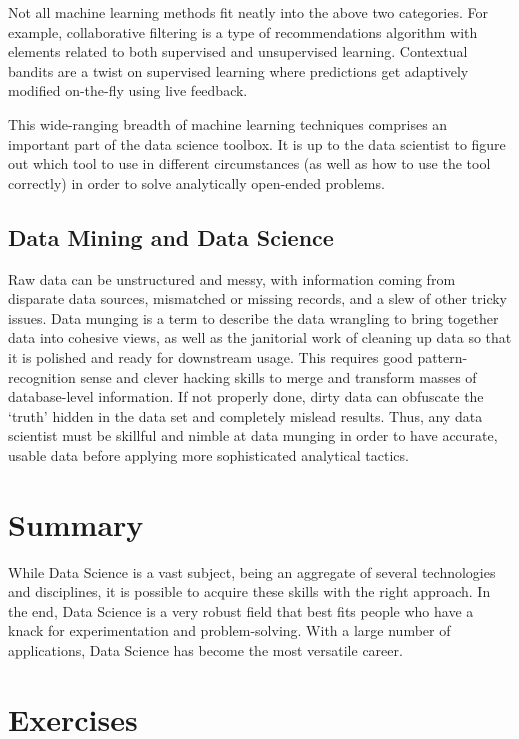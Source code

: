 \documentclass[
]{book}
\begin{document}
Not all machine learning methods fit neatly into the above two categories. For example, collaborative filtering is a type of recommendations algorithm with elements related to both supervised and unsupervised learning. Contextual bandits are a twist on supervised learning where predictions get adaptively modified on-the-fly using live feedback.

This wide-ranging breadth of machine learning techniques comprises an important part of the data science toolbox. It is up to the data scientist to figure out which tool to use in different circumstances (as well as how to use the tool correctly) in order to solve analytically open-ended problems.

\hypertarget{data-mining-and-data-science}{%
\subsection*{Data Mining and Data Science}\label{data-mining-and-data-science}}


Raw data can be unstructured and messy, with information coming from disparate data sources, mismatched or missing records, and a slew of other tricky issues. Data munging is a term to describe the data wrangling to bring together data into cohesive views, as well as the janitorial work of cleaning up data so that it is polished and ready for downstream usage. This requires good pattern-recognition sense and clever hacking skills to merge and transform masses of database-level information. If not properly done, dirty data can obfuscate the `truth' hidden in the data set and completely mislead results. Thus, any data scientist must be skillful and nimble at data munging in order to have accurate, usable data before applying more sophisticated analytical tactics.

\hypertarget{summary}{%
\section*{Summary}\label{summary}}


While Data Science is a vast subject, being an aggregate of several technologies and disciplines, it is possible to acquire these skills with the right approach. In the end, Data Science is a very robust field that best fits people who have a knack for experimentation and problem-solving. With a large number of applications, Data Science has become the most versatile career.

\hypertarget{exercises}{%
\section*{Exercises}\label{exercises}}
\end{document}
